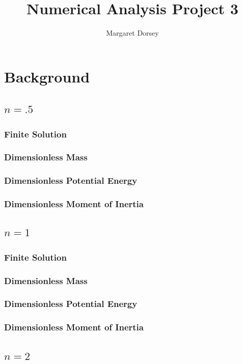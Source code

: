 \documentclass[11pt]{article} %
\title{Numerical Analysis Project 3}
\author{Margaret Dorsey}
\begin{document}
\maketitle

\section*{Background}
\subsection*{$n = .5$}
\subsubsection*{Finite Solution}
\subsubsection*{Dimensionless Mass}
\subsubsection*{Dimensionless Potential Energy}
\subsubsection*{Dimensionless Moment of Inertia}

\subsection*{$n = 1$}
\subsubsection*{Finite Solution}
\subsubsection*{Dimensionless Mass}
\subsubsection*{Dimensionless Potential Energy}
\subsubsection*{Dimensionless Moment of Inertia}

\subsection*{$n = 2$}
\end{document}

